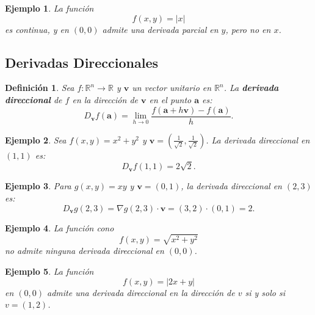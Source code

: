 \documentclass[11pt]{book}
\theoremstyle{definicion}
\theoremstyle{teorema}
\theoremstyle{ejemplo}
\newtheorem{definition}{Definición}
\newtheorem{example}{Ejemplo}
\begin{document}
\begin{example}
    La funci\'on  
    \[
    f(x,y) = |x|
    \]
    es continua, y en $(0,0)$ admite una derivada parcial en $y$, pero no en $x$.
\end{example}




\subsection{Derivadas Direccionales}

\begin{definition}
Sea \( f: \mathbb{R}^n \to \mathbb{R} \) y \( \mathbf{v} \) un vector unitario en \( \mathbb{R}^n \). La \textbf{derivada direccional} de \( f \) en la dirección de \( \mathbf{v} \) en el punto \( \mathbf{a} \) es:
\[
D_{\mathbf{v}} f(\mathbf{a}) = \lim_{h \to 0} \frac{f(\mathbf{a} + h\mathbf{v}) - f(\mathbf{a})}{h}.
\]
\end{definition}

\begin{example}
Sea \( f(x, y) = x^2 + y^2 \) y \( \mathbf{v} = \left( \frac{1}{\sqrt{2}}, \frac{1}{\sqrt{2}} \right) \). La derivada direccional en \( (1, 1) \) es:
\[
D_{\mathbf{v}} f(1, 1) = %
2\sqrt{2}.
\]
\end{example}

\begin{example}
Para \( g(x, y) = xy \) y \( \mathbf{v} = (0, 1) \), la derivada direccional en \( (2, 3) \) es:
\[
D_{\mathbf{v}} g(2, 3) = \nabla g(2,3) \cdot \mathbf{v} = (3, 2) \cdot (0, 1) = 2.
\]
\end{example}

\begin{example}
    La funci\'on cono 
    \[
    f(x,y) = \sqrt{x^2+y^2}
    \]
     no admite ninguna derivada direccional en $(0,0)$. 
\end{example}

\begin{example}
    La funci\'on  
    \[
    f(x,y) = |2x+y|
    \]
    en $(0,0)$ admite una derivada direccional en la direcci\'on de $v$ si y solo si $v=(1,2)$.
%
%    
\end{example}
\end{document}
